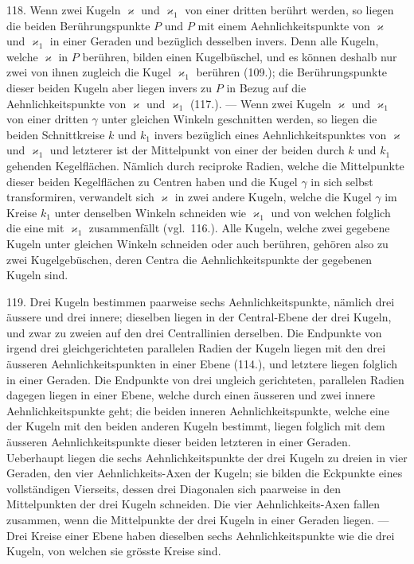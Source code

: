 118. Wenn zwei Kugeln $\varkappa$ und $\varkappa_1$ von einer dritten
ber\"uhrt werden, so liegen die beiden Ber\"uhrungspunkte $P$ und
$P$ mit einem Aehnlichkeitspunkte von $\varkappa$ und $\varkappa_1$ in einer
Geraden und bez\"uglich desselben invers. Denn alle Kugeln,
welche $\varkappa$ in $P$ ber\"uhren, bilden einen Kugelb\"uschel, und es
k\"onnen deshalb nur zwei von ihnen zugleich die Kugel $\varkappa_1$
ber\"uhren (109.); die Ber\"uhrungspunkte dieser beiden Kugeln
aber liegen invers zu $P$ in Bezug auf die Aehnlichkeitspunkte
von $\varkappa$ und $\varkappa_1$ (117.). --- Wenn zwei Kugeln $\varkappa$ und $\varkappa_1$ von
einer dritten $\gamma$ unter gleichen Winkeln geschnitten werden,
so liegen die beiden Schnittkreise $k$ und $k_1$ invers bez\"uglich
eines Aehnlichkeitspunktes von $\varkappa$ und $\varkappa_1$ und letzterer ist
der Mittelpunkt von einer der beiden durch $k$ und $k_1$ gehenden
Kegelfl\"achen. N\"amlich durch reciproke Radien, welche
die Mittelpunkte dieser beiden Kegelfl\"achen zu Centren haben
und die Kugel $\gamma$ in sich selbst transformiren, verwandelt
sich $\varkappa$ in zwei andere Kugeln, welche die Kugel $\gamma$ im Kreise
$k_1$ unter denselben Winkeln schneiden wie $\varkappa_1$ und von welchen
folglich die eine mit $\varkappa_1$ zusammenf\"allt (vgl.~116.). Alle Kugeln,
welche zwei gegebene Kugeln unter gleichen Winkeln schneiden
oder auch ber\"uhren, geh\"oren also zu zwei Kugelgeb\"uschen,
deren Centra die Aehnlichkeitspunkte der gegebenen
Kugeln sind.

119. Drei Kugeln bestimmen paarweise sechs Aehnlichkeitspunkte,
n\"am\-lich drei \"aussere und drei innere; dieselben
liegen in der Central-Ebene der drei Kugeln, und zwar zu
zweien auf den drei Centrallinien derselben. Die Endpunkte
von irgend drei gleichgerichteten parallelen Radien der Kugeln
liegen mit den drei \"ausseren Aehnlichkeitspunkten in einer
Ebene (114.), und letztere liegen folglich in einer Geraden.
Die Endpunkte von drei ungleich gerichteten, parallelen
Radien dagegen liegen in einer Ebene, welche durch einen
\"ausseren und zwei innere Aehnlichkeitspunkte geht; die beiden
inneren Aehnlichkeitspunkte, welche eine der Kugeln mit den
beiden anderen Kugeln bestimmt, liegen folglich mit dem
\"ausseren Aehnlichkeitspunkte dieser beiden letzteren in einer
Geraden. Ueberhaupt liegen die sechs Aehnlichkeitspunkte
der drei Kugeln zu dreien in vier Geraden, den vier {\glqq}Aehnlichkeits-Axen{\grqq}
der Kugeln; sie bilden die Eckpunkte eines vollst\"andigen
Vierseits, dessen drei Diagonalen sich paarweise
in den Mittelpunkten der drei Kugeln schneiden. Die vier
Aehnlichkeits-Axen fallen zusammen, wenn die Mittelpunkte
der drei Kugeln in einer Geraden liegen. --- Drei Kreise
einer Ebene haben dieselben sechs Aehnlichkeitspunkte wie
die drei Kugeln, von welchen sie gr\"osste Kreise sind.

